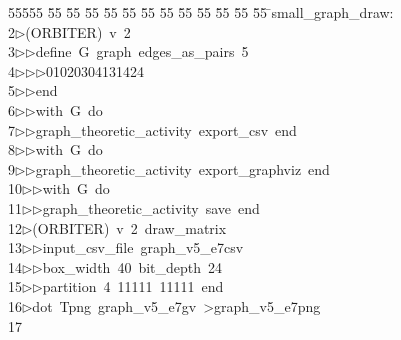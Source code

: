 %
%
\begin{tabbing}
55555 \= 55 \= 55 \= 55 \= 55 \= 55 \= 55 \= 55 \= 55 \= 55 \= 55 \= 55 \= 55 \= \>small\_graph\_draw:\\[0pt]
2\>$\triangleright$\>(ORBITER)\ v\ 2\ \\[0pt]
3\>$\triangleright$\>$\triangleright$\>define\ G\ graph\ edges\_as\_pairs\ 5\ \\[0pt]
4\>$\triangleright$\>$\triangleright$\>$\triangleright$\>01020304131424\ \\[0pt]
5\>$\triangleright$\>$\triangleright$\>end\ \\[0pt]
6\>$\triangleright$\>$\triangleright$\>with\ G\ do\ \\[0pt]
7\>$\triangleright$\>$\triangleright$\>graph\_theoretic\_activity\ export\_csv\ end\ \\[0pt]
8\>$\triangleright$\>$\triangleright$\>with\ G\ do\ \\[0pt]
9\>$\triangleright$\>$\triangleright$\>graph\_theoretic\_activity\ export\_graphviz\ end\ \\[0pt]
10\>$\triangleright$\>$\triangleright$\>with\ G\ do\ \\[0pt]
11\>$\triangleright$\>$\triangleright$\>graph\_theoretic\_activity\ save\ end\\[0pt]
12\>$\triangleright$\>(ORBITER)\ v\ 2\ draw\_matrix\ \\[0pt]
13\>$\triangleright$\>$\triangleright$\>input\_csv\_file\ graph\_v5\_e7csv\ \\[0pt]
14\>$\triangleright$\>$\triangleright$\>box\_width\ 40\ bit\_depth\ 24\ \\[0pt]
15\>$\triangleright$\>$\triangleright$\>partition\ 4\ 11111\ 11111\ end\\[0pt]
16\>$\triangleright$\>dot\ Tpng\ graph\_v5\_e7gv\ {\textgreater}graph\_v5\_e7png\\[0pt]
17\>\end{tabbing}
